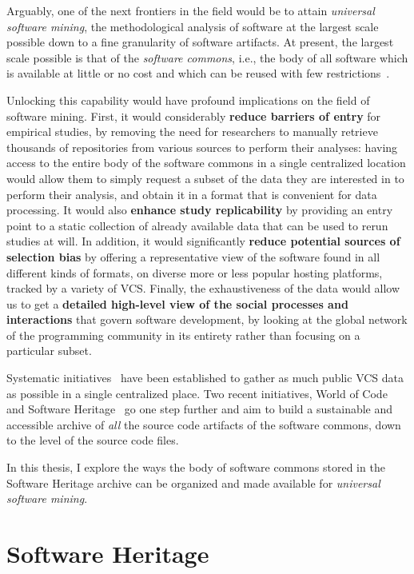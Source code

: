 Arguably, one of the next frontiers in the field would be to attain
\emph{universal software mining}, the methodological analysis of software at
the largest scale possible down to a fine granularity of software artifacts.
At present, the largest scale possible is that of the \emph{software commons},
i.e., the body of all software which is available at little or no cost and
which can be reused with few
restrictions~\cite{1999-beagle-in-commons,kranich2008information}.

Unlocking this capability would have profound implications on the field of
software mining. First, it would considerably \textbf{reduce barriers of entry}
for empirical studies, by removing the need for researchers to manually
retrieve thousands of repositories from various sources to perform their
analyses: having access to the entire body of the software commons in a single
centralized location would allow them to simply request a subset of the data
they are interested in to perform their analysis, and obtain it in a format
that is convenient for data processing. It would also \textbf{enhance study
replicability} by providing an entry point to a static collection of already
available data that can be used to rerun studies at will.
In addition, it would significantly \textbf{reduce potential sources of
selection bias} by offering a representative view of the software found in
all different kinds of formats, on diverse more or less popular hosting
platforms, tracked by a variety of \gls{VCS}.  Finally, the exhaustiveness of
the data would allow us to get a \textbf{detailed high-level view of the social
processes and interactions} that govern software development, by looking at the
global network of the programming community in its entirety rather than
focusing on a particular subset.

Systematic initiatives~\cite{flossmole2006,gao2007archive,mockus2009}
have been established to gather as much public \gls{VCS} data as possible in a
single centralized place. Two recent initiatives, World of
Code~\cite{mockus2019woc} and Software Heritage~\cite{swhipres2017,
swhcacm2018} go one step further and aim to build a sustainable and accessible
archive of \emph{all} the source code artifacts of the software commons, down
to the level of the source code files.

In this thesis, I explore the ways the body of software commons stored in the
Software Heritage archive can be organized and made available for
\emph{universal software mining}.

\section{Software Heritage}

\lipsum[3]
